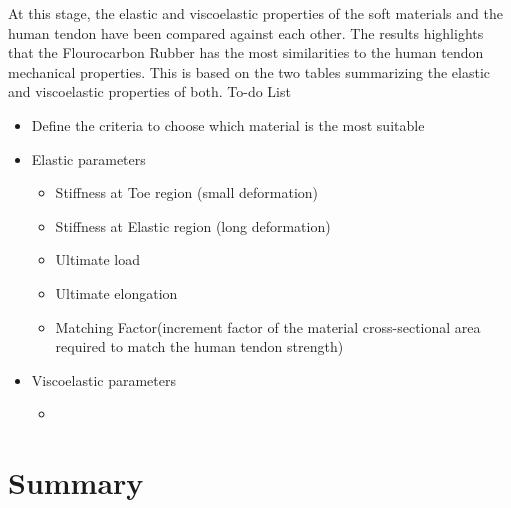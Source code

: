 At this stage, the elastic and viscoelastic properties of the soft materials and the human tendon have been compared against each other. The results highlights that the Flourocarbon Rubber  has the most similarities to the human tendon mechanical properties. This is based on the two tables summarizing the elastic and viscoelastic properties of both.
To-do List
\begin{itemize}
    \item Define the criteria to choose which material is the most suitable
    \item Elastic parameters
    \begin{itemize}
        \item Stiffness at Toe region (small deformation)
        \item Stiffness at Elastic region (long deformation)
        \item Ultimate load
        \item Ultimate elongation
        \item Matching Factor(increment factor of the material cross-sectional area required to match the human tendon strength)
        
    \end{itemize}
    \item Viscoelastic parameters
    \begin{itemize}
        \item 
    \end{itemize}
\end{itemize}



\section{Summary}